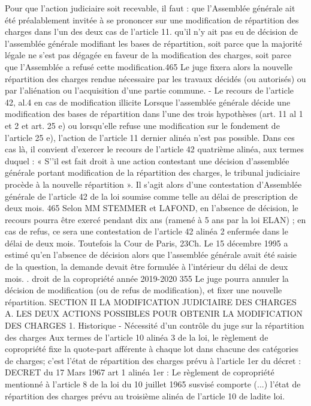 Pour que l'action judiciaire soit recevable, il faut :
que l’Assemblée générale ait été préalablement invitée à se prononcer sur une modification de répartition des charges dans l’un des deux cas de l’article 11.
qu'il n'y ait pas eu de décision de l'assemblée générale modifiant les bases de répartition, soit parce que la majorité légale ne s'est pas dégagée en faveur de la modification des charges, soit parce que l’Assemblée a refusé cette modification.465
Le juge fixera alors la nouvelle répartition des charges rendue nécessaire par les travaux décidés (ou autorisés) ou par l’aliénation ou l’acquisition d’une partie commune.
- Le recours de l'article 42, al.4 en cas de modification illicite
Lorsque l'assemblée générale décide une modification des bases de répartition dans l'une des trois hypothèses (art. 11 al 1 et 2 et art. 25 e) ou lorsqu’elle refuse une modification sur le fondement de l’article 25 e), l'action de l'article 11 dernier alinéa n'est pas possible.
Dans ces cas là, il convient d'exercer le recours de l'article 42 quatrième alinéa, aux termes duquel :
« S’'il est fait droit à une action contestant une décision d'assemblée générale portant modification de la répartition des charges, le tribunal judiciaire procède à la nouvelle répartition ».
Il s’agit alors d’une contestation d’Assemblée générale de l’article 42 de la loi soumise comme telle au délai de prescription de deux mois.
465 Selon MM STEMMER et LAFOND, en l’absence de décision, le recours pourra être exercé pendant dix ans (ramené à 5 ans par la loi ELAN) ; en cas de refus, ce sera une contestation de l’article 42 alinéa 2 enfermée dans le délai de deux mois. Toutefois la Cour de Paris, 23\degres Ch. Le 15 décembre 1995 a estimé qu’en l’absence de décision alors que l’assemblée générale avait été saisie de la question, la demande devait être formulée à l’intérieur du délai de deux mois.
.
droit de la copropriété année 2019-2020
355
Le juge pourra annuler la décision de modification (ou de refus de modification), et fixer une nouvelle répartition.
SECTION II LA MODIFICATION JUDICIAIRE DES CHARGES
A. LES DEUX ACTIONS POSSIBLES POUR OBTENIR LA MODIFICATION DES CHARGES
1. Historique
- Nécessité d’un contrôle du juge sur la répartition des charges
Aux termes de l'article 10 alinéa 3 de la loi, le règlement de copropriété fixe la quote-part afférente à chaque lot dans chacune des catégories de charges; c'est l'état de répartition des charges prévu à l'article 1er du décret :
DECRET du 17 Mars 1967 art 1 alinéa 1er :
Le règlement de copropriété mentionné à l'article 8 de la loi du 10 juillet 1965 susvisé comporte (...) l'état de répartition des charges prévu au troisième alinéa de l'article 10 de ladite loi.
